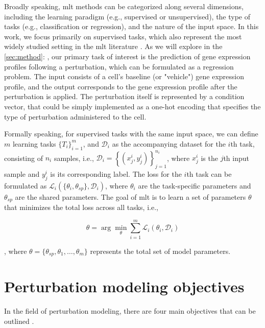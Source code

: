 \documentclass[12pt, a4paper]{article}
\newcommand{\crefwithname}[1]{\cref{#1}: \nameref{#1}}
\begin{document}
Broadly speaking, \gls{mlt} methods can be categorized along several dimensions, including the learning paradigm (e.g., supervised or unsupervised), the type of tasks (e.g., classification or regression), and the nature of the input space. In this work, we focus primarily on supervised tasks, which also represent the most widely studied setting in the \gls{mlt} literature \cite{zhangSurveyMultiTaskLearning2021}.
As we will explore in the \crefwithname{sec:method}, our primary task of interest is the prediction of gene expression profiles following a perturbation, which can be formulated as a regression problem. The input consists of a cell’s baseline (or "vehicle") gene expression profile, and the output corresponds to the gene expression profile after the perturbation is applied. The perturbation itself is represented by a condition vector, that could be simply implemented as a one-hot encoding that specifies the type of perturbation administered to the cell.

Formally speaking, for supervised tasks with the same input space, we can define $m$ learning tasks $\{T_{i}\}_{i=1}^m$, and $\mathcal{D}_i$ as the accompanying dataset for the $i$th task, consisting of $n_i$ samples, i.e., $\mathcal{D}_i = \left\{(x_j^i, y_j^i)\right\}_{j=1}^{n_i}$, where $x_j^i$ is the $j$th input sample and $y_j^i$ is its corresponding label.
The loss for the $i$th task can be formulated as $\mathcal{L}_i(\{\theta_i, \theta_{sp}\}, \mathcal{D}_i)$, where $\theta_i$ are the task-specific parameters and $\theta_{sp}$ are the shared parameters.
The goal of \gls{mlt} is to learn a set of parameters $\theta$ that minimizes the total loss across all tasks, i.e.,

\[
\theta = \arg\min_{\theta} \sum_{i=1}^m \mathcal{L}_i(\theta_i, \mathcal{D}_i)
\]

, where $\theta = \{\theta_{sp}, \theta_1, \dots, \theta_m\}$ represents the total set of model parameters.
% 


\section{Perturbation modeling objectives}

In the field of perturbation modeling, there are four main objectives that can be outlined \cite{gavriilidisMinireviewPerturbationModelling2024, jiMachineLearningPerturbational2021, heumos2023best}.
\end{document}
